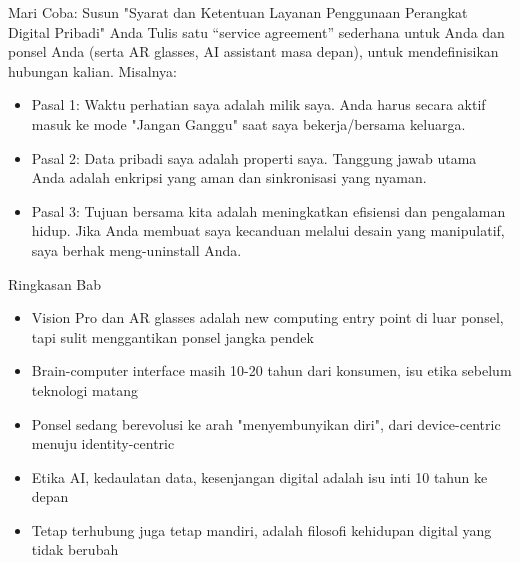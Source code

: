 \begin{tcbpractice}{Mari Coba: Susun "Syarat dan Ketentuan Layanan Penggunaan Perangkat Digital Pribadi" Anda}
Tulis satu “service agreement” sederhana untuk Anda dan ponsel Anda (serta AR glasses, AI assistant masa depan), untuk mendefinisikan hubungan kalian. Misalnya:

\begin{itemize}
  \item Pasal 1: Waktu perhatian saya adalah milik saya. Anda harus secara aktif masuk ke mode "Jangan Ganggu" saat saya bekerja/bersama keluarga.
  \item Pasal 2: Data pribadi saya adalah properti saya. Tanggung jawab utama Anda adalah enkripsi yang aman dan sinkronisasi yang nyaman.
  \item Pasal 3: Tujuan bersama kita adalah meningkatkan efisiensi dan pengalaman hidup. Jika Anda membuat saya kecanduan melalui desain yang manipulatif, saya berhak meng-uninstall Anda.
\end{itemize}

\end{tcbpractice}

\begin{tcbsummary}{Ringkasan Bab}
\begin{itemize}
  \item Vision Pro dan AR glasses adalah new computing entry point di luar ponsel, tapi sulit menggantikan ponsel jangka pendek
  \item Brain-computer interface masih 10-20 tahun dari konsumen, isu etika sebelum teknologi matang
  \item Ponsel sedang berevolusi ke arah "menyembunyikan diri", dari device-centric menuju identity-centric
  \item Etika AI, kedaulatan data, kesenjangan digital adalah isu inti 10 tahun ke depan
  \item Tetap terhubung juga tetap mandiri, adalah filosofi kehidupan digital yang tidak berubah
\end{itemize}

\end{tcbsummary}
